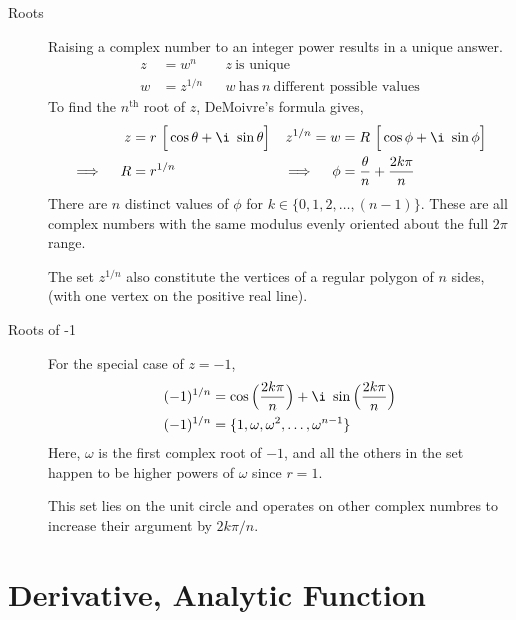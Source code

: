 \begin{description}
    \item[Roots] Raising a complex number to an integer power results in a unique answer.
        \begin{align}
            z & = w^n     &  & z\ \text{is unique}                                \\
            w & = z^{1/n} &  & w\ \text{has}\ n\ \text{different possible values}
        \end{align}
        To find the $ n^{\text{th}} $ root of $ z $, DeMoivre's formula gives,
        \begin{align}
            z                   & = r\ \Big[ \cos\theta + \i\ \sin\theta \Big] &
            z^{1/n} = w         & = R\ \Big[ \cos\phi + \i\ \sin\phi \Big]       \\
            \implies \quad R    & = r^{1/n}                                    &
            \implies \quad \phi & = \frac{\theta}{n} + \frac{2k\pi}{n}
        \end{align}
        There are $ n $ distinct values of $ \phi $ for $ k \in \{0, 1, 2, \dots, (n-1)
            \} $. These are all complex numbers with the same modulus evenly oriented
        about the full $ 2\pi $ range. \par
        The set $ z^{1/n} $ also constitute the vertices of a regular polygon of $ n $
        sides, (with one vertex on the positive real line). \par
    \item[Roots of -1] For the special case of $ z = -1 $,
        \begin{align}
            (-1)^{1/n} & = \cos \Big( \frac{2k\pi}{n} \Big)
            + \i\ \sin\Big( \frac{2k\pi}{n} \Big)                       \\
            (-1)^{1/n} & = \{1, \omega, \omega^2, \dots, \omega^{n-1}\}
        \end{align}
        Here, $ \omega $ is the first complex root of $ -1 $, and all the others in the
        set happen to be higher powers of $ \omega $ since $ r = 1 $. \par
        This set lies on the unit circle and operates on other complex numbres to
        increase their argument by $ 2k\pi/n $.
\end{description}

\section{Derivative, Analytic Function}

